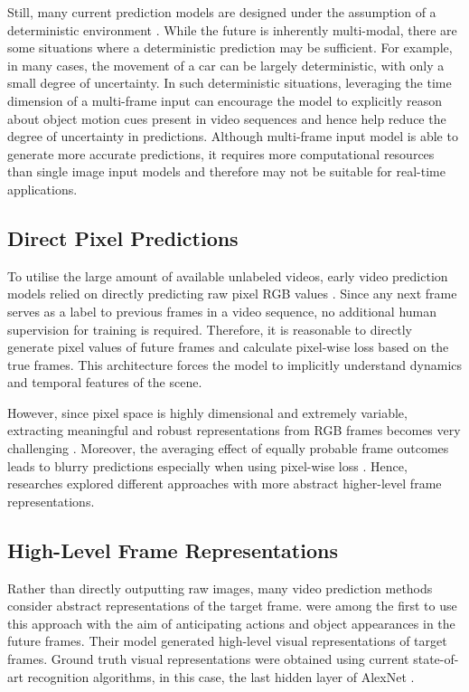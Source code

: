 \documentclass{l4proj}
\begin{document}
Still, many current prediction models are designed under the assumption of a deterministic environment \citep{DBLP:journals/corr/VondrickPT15, DBLP:journals/corr/LotterKC16, DBLP:journals/corr/RanzatoSBMCC14, DBLP:journals/corr/SrivastavaMS15}. While the future is inherently multi-modal, there are some situations where a deterministic prediction may be sufficient. For example, in many cases, the movement of a car can be largely deterministic, with only a small degree of uncertainty. In such deterministic situations, leveraging the time dimension of a multi-frame input can encourage the model to explicitly reason about object motion cues present in video sequences and hence help reduce the degree of uncertainty in predictions. Although multi-frame input model is able to generate more accurate predictions, it requires more computational resources than single image input models and therefore may not be suitable for real-time applications.

\subsection{Direct Pixel Predictions}
To utilise the large amount of available unlabeled videos, early video prediction models relied on directly predicting raw pixel RGB values \citep{DBLP:journals/corr/KalchbrennerOSD16, DBLP:journals/corr/SrivastavaMS15, DBLP:journals/corr/RanzatoSBMCC14}. Since any next frame serves as a label to previous frames in a video sequence, no additional human supervision for training is required. Therefore, it is reasonable to directly generate pixel values of future frames and calculate pixel-wise loss based on the true frames. This architecture forces the model to implicitly understand dynamics and temporal features of the scene. 

However, since pixel space is highly dimensional and extremely variable, extracting meaningful and robust representations from RGB frames becomes very challenging \citep{DBLP:journals/corr/NeverovaLCVL17}. Moreover, the averaging effect of equally probable frame outcomes leads to blurry predictions especially when using pixel-wise loss \citep{DBLP:journals/corr/abs-2104-09498}. Hence, researches explored different approaches with more abstract higher-level frame representations.

\subsection{High-Level Frame Representations} \label{high-level}
Rather than directly outputting raw images, many video prediction methods consider abstract representations of the target frame. \cite{DBLP:conf/cvpr/VondrickPT16} were among the first to use this approach with the aim of anticipating actions and object appearances in the future frames. Their model generated high-level visual representations of target frames. Ground truth visual representations were obtained using current state-of-art recognition algorithms, in this case, the last hidden layer of AlexNet \citep{DBLP:conf/nips/KrizhevskySH12}.
\end{document}
